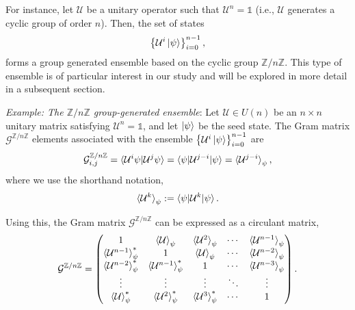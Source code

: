 \documentclass[12pt,letterpaper]{article}
\begin{document}
\begin{multicols}{2}
For instance, let $\mathcal{U}$ be a unitary operator such that $\mathcal{U}^n = \mathds{1}$ (i.e., $\mathcal{U}$ generates a cyclic group of order $n$). Then, the set of states
\begin{align*}
	\left\{ \mathcal{U}^i\ket{\psi} \right\}_{i=0}^{n-1},
\end{align*}
forms a group generated ensemble based on the cyclic group $\mathbb{Z}/n\mathbb{Z}$. This type of ensemble is of particular interest in our study and will be explored in more detail in a subsequent section.

\emph{Example: The $\mathbb{Z}/n\mathbb{Z}$ group-generated ensemble}: Let $\mathcal{U} \in U(n)$ be an $n \times n$ unitary matrix satisfying $\mathcal{U}^n = \mathds{1}$, and let $\ket{\psi}$ be the seed state. The Gram matrix $\mathcal{G}^{\mathbb{Z}/n\mathbb{Z}}$ elements associated with the ensemble $\left\{\mathcal{U}^i\ket{\psi}\right\}_{i=0}^{n-1}$ are
\begin{align*}
	\mathcal{G}^{\mathbb{Z}/n\mathbb{Z}}_{i,j} = \braket{\mathcal{U}^i\psi | \mathcal{U}^j\psi} = \braket{\psi | \mathcal{U}^{j-i} | \psi} = \braket{\mathcal{U}^{j-i}}_{\psi},
\end{align*}
where we use the shorthand notation,
\begin{align*}
	\braket{\mathcal{U}^k}_\psi := \braket{\psi | \mathcal{U}^k | \psi}.
\end{align*}

Using this, the Gram matrix $\mathcal{G}^{\mathbb{Z}/n\mathbb{Z}}$ can be expressed as a circulant matrix,
\begin{align*}
	\mathcal{G}^{\mathbb{Z}/n\mathbb{Z}} = \begin{pmatrix}
 1 & \braket{\mathcal{U}}_{\psi} & \braket{\mathcal{U}^2}_{\psi} & \cdots & \braket{\mathcal{U}^{n-1}}_{\psi} \\
 \braket{\mathcal{U}^{n-1}}_{\psi}^* & 1 & \braket{\mathcal{U}}_{\psi} & \cdots & \braket{\mathcal{U}^{n-2}}_{\psi} \\
 \braket{\mathcal{U}^{n-2}}_{\psi}^* & \braket{\mathcal{U}^{n-1}}_{\psi}^* & 1 & \cdots & \braket{\mathcal{U}^{n-3}}_{\psi} \\
 \vdots & \vdots & \vdots & \ddots & \vdots \\
 \braket{\mathcal{U}}_{\psi}^* & \braket{\mathcal{U}^{2}}_{\psi}^* & \braket{\mathcal{U}^{3}}_{\psi}^* & \cdots & 1
\end{pmatrix}.
\end{align*}


\end{multicols}
\end{document}
